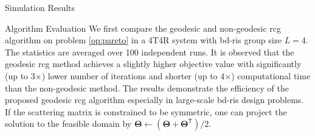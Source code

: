\begin{section}{Simulation Results}
\begin{subsection}{Algorithm Evaluation}
		We first compare the geodesic and non-geodesic \gls{rcg} algorithm on problem \eqref{op:pareto} in a 4T4R system with \gls{bd}-\gls{ris} group size $L=4$.
		The statistics are averaged over \num{100} independent runs.
		It is observed that the geodesic \gls{rcg} method achieves a slightly higher objective value with significantly (up to 3$\times$) lower number of iterations and shorter (up to 4$\times$) computational time than the non-geodesic method.
		The results demonstrate the efficiency of the proposed geodesic \gls{rcg} algorithm especially in large-scale \gls{bd}-\gls{ris} design problems.
		If the scattering matrix is constrained to be symmetric, one can project the solution to the feasible domain by $\mathbf{\Theta} \gets (\mathbf{\Theta} + \mathbf{\Theta}^\mathsf{T})/2$.
	\end{subsection}



\end{section}
